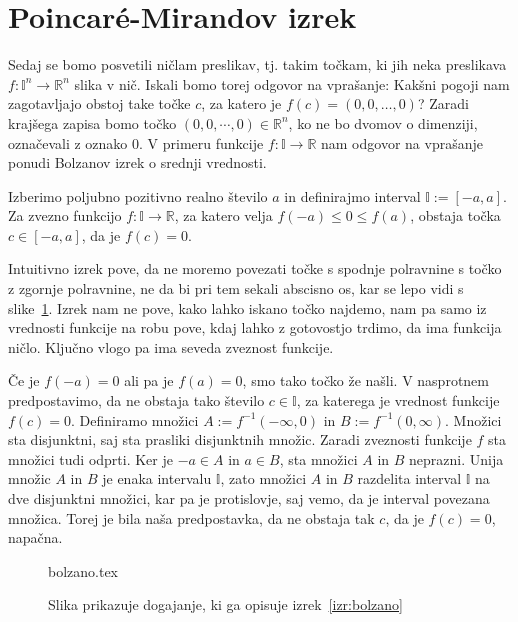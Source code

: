 \documentclass[mat1]{fmfdelo}
\newcommand{\R}{\mathbb R}
\newcommand{\I}{\mathbb I}
\newcommand{\0}{0}
\begin{document}
\section{Poincar\'e-Mirandov izrek}\label{raz:PM}
Sedaj se bomo posvetili ničlam preslikav, tj. takim točkam, ki jih neka preslikava $f : \I^n \to \R^n$ slika v nič. Iskali bomo torej odgovor na vprašanje: Kakšni pogoji nam zagotavljajo obstoj take točke $c$, za katero je $f(c) = (0, 0, \dots, 0)$? Zaradi krajšega zapisa bomo točko $(0, 0, \cdots, 0) \in \R^n$, ko ne bo dvomov o dimenziji, označevali z oznako $\0$. V primeru funkcije $f : \I \to \R$ nam odgovor na vprašanje ponudi Bolzanov izrek o srednji vrednosti.
\begin{izrek}\label{izr:bolzano}
Izberimo poljubno pozitivno realno število $a$ in definirajmo interval $\I := [-a, a]$. Za zvezno funkcijo $f : \I \to \R$, za katero velja $f(-a) \leq 0 \leq f(a)$, obstaja točka $c \in [-a, a]$, da je $f(c) = 0$.
\end{izrek}
Intuitivno izrek pove, da ne moremo povezati točke s spodnje polravnine s točko z zgornje polravnine, ne da bi pri tem sekali abscisno os, kar se lepo vidi s slike~\ref{fig:bolzano}. Izrek nam ne pove, kako lahko iskano točko najdemo, nam pa samo iz vrednosti funkcije na robu pove, kdaj lahko z gotovostjo trdimo, da ima funkcija ničlo. Ključno vlogo pa ima seveda zveznost funkcije.
\begin{dokaz}
Če je $f(-a) = 0$ ali pa je $f(a) = 0$, smo tako točko že našli. V nasprotnem predpostavimo, da ne obstaja tako število $c \in \I$, za katerega je vrednost funkcije $f(c) = 0$. Definiramo množici $A := f^{-1}(- \infty, 0)$ in $B := f^{-1}(0, \infty)$. Množici sta disjunktni, saj sta prasliki disjunktnih množic. Zaradi zveznosti funkcije $f$ sta množici tudi odprti. Ker je $-a \in A$ in $a \in B$, sta množici $A$ in $B$ neprazni. Unija množic $A$ in $B$ je enaka intervalu $\I$, zato množici $A$ in $B$ razdelita interval $\I$ na dve disjunktni množici, kar pa je protislovje, saj vemo, da je interval povezana množica. Torej je bila naša predpostavka, da ne obstaja tak $c$, da je $f(c) = 0$, napačna.
\end{dokaz}
\begin{figure}[h!]
	\centering
	{bolzano.tex}
	\caption{Slika prikazuje dogajanje, ki ga opisuje izrek~\ref{izr:bolzano}}\label{fig:bolzano}
\end{figure}
\end{document}
